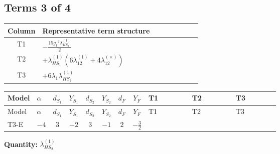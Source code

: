 \documentclass[8pt]{article}
\begin{document}
\begin{landscape}
\subsection*{Terms 3 of 4}
\begin{center}
\begin{tabular}{@{}c >{\raggedright\arraybackslash}p{0.82\linewidth}@{}}
\toprule
Column & Representative term structure \\
\midrule
T1 & \(\displaystyle -\frac{15 {g_1}^2 {\lambda_{HS_2}^{(1)}}}{2}\) \\
\midrule
T2 & \(\displaystyle +{\lambda_{HS_1}^{(1)}} (6 {\lambda_{12}^{(1)}}+4 {\lambda_{12}^{(\times)}})\) \\
\midrule
T3 & \(\displaystyle +6 {\lambda_1} {\lambda_{HS_2}^{(1)}}\) \\
\midrule
\bottomrule
\end{tabular}
\end{center}
\smallskip
\tiny
\begin{longtable}{@{}llcccccc >{\raggedright\arraybackslash}p{0.21\linewidth} >{\raggedright\arraybackslash}p{0.21\linewidth} >{\raggedright\arraybackslash}p{0.21\linewidth}@{}}
\toprule
Model & $\alpha$ & $d_{S_1}$ & $Y_{S_1}$ & $d_{S_2}$ & $Y_{S_2}$ & $d_F$ & $Y_F$ & T1 & T2 & T3 \\
\midrule
\endfirsthead
\toprule
Model & $\alpha$ & $d_{S_1}$ & $Y_{S_1}$ & $d_{S_2}$ & $Y_{S_2}$ & $d_F$ & $Y_F$ & T1 & T2 & T3 \\
\midrule
\endhead
T3-E & $-4$ & $3$ & $-2$ & $3$ & $-1$ & $2$ & $-\frac{3}{2}$ & \scriptsize\adjustbox{max width=\linewidth}{$\begin{gathered} -\frac{15 {g_1}^2 {\lambda_{HS_2}^{(1)}}}{2}\end{gathered}$} & \scriptsize\adjustbox{max width=\linewidth}{$\begin{gathered} +{\lambda_{HS_1}^{(1)}} (6 {\lambda_{12}^{(1)}}+4 {\lambda_{12}^{(\times)}})\end{gathered}$} & \scriptsize\adjustbox{max width=\linewidth}{$\begin{gathered} +6 {\lambda_1} {\lambda_{HS_2}^{(1)}}\end{gathered}$} \\
\midrule
\bottomrule
\end{longtable}
\clearpage
\noindent\textbf{Quantity: }$\lambda_{HS_2}^{(1)}$\par\smallskip

\end{landscape}
\end{document}
